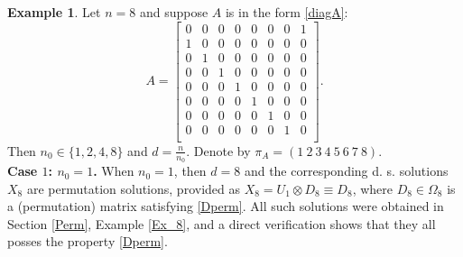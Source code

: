 \documentclass{article}
\theoremstyle{definition}\newtheorem{example}{Example}[section]
\begin{document}
	\begin{example}
		Let $n=8$ and suppose $A$ is in the form \eqref{diagA}:
		$$A=\left[\begin{array}{cccccccc}
			0 & 0 & 0& 0 & 0 & 0 & 0 & 1\\
			1 & 0 & 0 & 0 & 0 & 0 & 0 & 0\\
			0 & 1 & 0 & 0 & 0 & 0 & 0 & 0\\
			0 & 0 & 1 & 0 & 0 & 0 & 0 & 0\\
			0 & 0 & 0 & 1 & 0 & 0 & 0 & 0\\
			0 & 0 & 0 & 0 & 1 & 0 & 0 & 0\\
			0 & 0 & 0 & 0 & 0 & 1 & 0 & 0\\
			0 & 0 & 0 & 0 & 0 & 0 & 1 & 0\\
		\end{array}\right].$$
		Then $n_0\in\{1,2,4,8\}$ and $d=\frac{n}{n_0}$. Denote by $\pi_A=(1 \ 2 \ 3\ 4\ 5\ 6\ 7\ 8)$.\\
		
		\noindent\textbf{Case $1$: $n_0=1$.} When $n_0=1$, then $d=8$ and the corresponding d. s. solutions $X_8$ are permutation solutions, provided as $X_8=U_1\otimes D_8\equiv D_8$, where $D_8\in\Omega_8$ is a (permutation) matrix satisfying \eqref{Dperm}. All such solutions were obtained in Section \ref{Perm}, Example \ref{Ex_8}, and a direct verification shows that they all posses the property \eqref{Dperm}.\\
		
		
		

\end{example}
\end{document}
